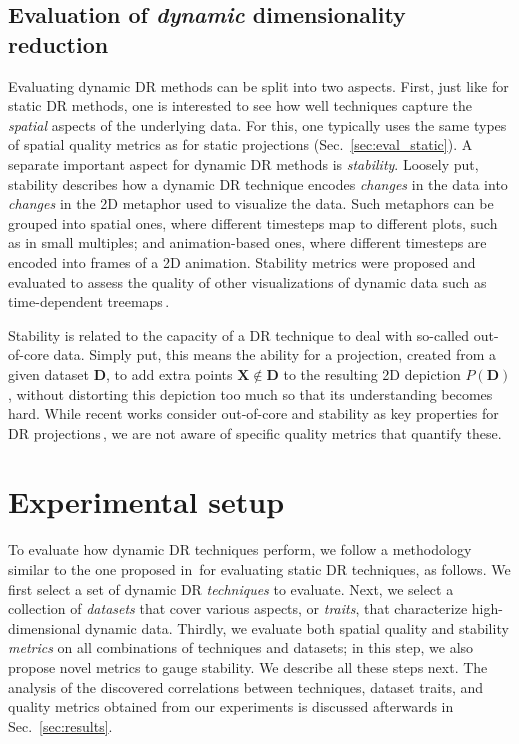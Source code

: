 \subsection{Evaluation of \textit{dynamic} dimensionality reduction}
\label{sec:eval_dynamic}
%
Evaluating dynamic DR methods can be split into two aspects. First, just like for static DR methods, one is interested to see how well techniques capture the \emph{spatial} aspects of the underlying data. For this, one typically uses the same types of spatial quality metrics as for static projections (Sec.~\ref{sec:eval_static}). A separate important aspect for dynamic DR methods is \emph{stability}. Loosely put, stability describes how a dynamic DR technique encodes \emph{changes} in the data into \emph{changes} in the 2D metaphor used to visualize the data. Such metaphors can be grouped into spatial ones, where different timesteps map to different plots, such as in small multiples; and animation-based ones, where different timesteps are encoded into frames of a 2D animation.
Stability metrics were proposed and evaluated to assess the quality of other visualizations of dynamic data such as time-dependent treemaps\,\cite{sondag17,vernier18git,vernier18software}.

Stability is related to the capacity of a DR technique to deal with so-called out-of-core data. Simply put, this means the ability for a projection, created from a given dataset $\mathbf{D}$, to add extra points $\mathbf{X} \notin \mathbf{D}$ to the resulting 2D depiction $P(\mathbf{D})$, without distorting this depiction too much so that its understanding becomes hard. While recent works consider out-of-core and stability as key properties for DR projections\,\cite{nonato_survey,Boytsov2017,MateusEspadoto,Garcia-fernandez2013,Buja2008}, we are not aware of specific quality metrics that quantify these.


\section{Experimental setup}
\label{sec:experiment}
%
To evaluate how dynamic DR techniques perform, we follow a methodology similar to the one proposed in\,\cite{EspadotoSurvey} for evaluating static DR techniques, as follows.
We first select a set of dynamic DR \emph{techniques} to evaluate. Next, we select a collection of \emph{datasets} that cover various aspects, or \emph{traits}, that characterize high-dimensional dynamic data. Thirdly, we evaluate both spatial quality and stability \emph{metrics} on all combinations of techniques and datasets; in this step, we also propose novel metrics to gauge stability. We describe all these steps next. The analysis of the discovered correlations between techniques, dataset traits, and quality metrics obtained from our experiments is discussed afterwards in Sec.~\ref{sec:results}.

